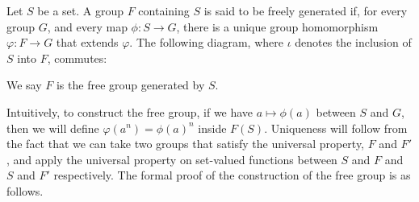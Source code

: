 %
\begin{definition}\label{def:free_group}
  Let $S$ be a set. A group $F$ containing $S$ is said to be freely generated if, for every group $G$, and every map $\phi\colon S\rightarrow G$, there is a unique group homomorphism $\varphi\colon F\rightarrow G$ that extends $\varphi$. The following diagram, where $\iota$ denotes the inclusion of $S$ into $F$, commutes:
  \begin{center}
  \end{center}
We say $F$ is the {free group} generated by $S$.
\end{definition}
Intuitively, to construct the free group, if we have $a\mapsto \phi(a)$ between $S$ and $G$, then we will define $\varphi\left(a^n\right) = \phi(a)^n$ inside $F(S)$. Uniqueness will follow from the fact that we can take two groups that satisfy the universal property, $F$ and $F'$, and apply the universal property on set-valued functions between $S$ and $F$ and $S$ and $F'$ respectively. The formal proof of the construction of the free group is as follows.

